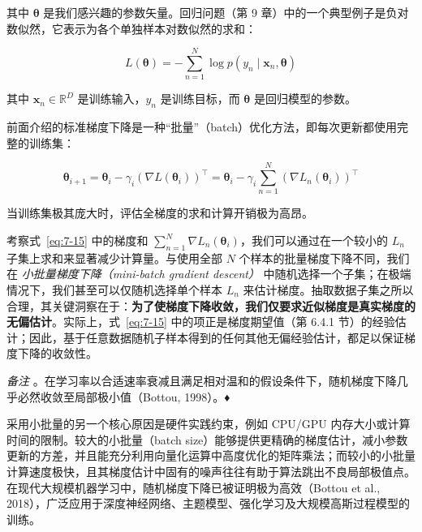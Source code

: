 其中 $ \boldsymbol{\theta} $ 是我们感兴趣的参数矢量。回归问题（第 9 章）中的一个典型例子是负对数似然，它表示为各个单独样本对数似然的求和：

\begin{equation}
L(\boldsymbol{\theta}) = -\sum_{n=1}^N \log p(y_n \mid \boldsymbol{x}_n, \boldsymbol{\theta})
\tag{7.14}\label{eq:7-14}
\end{equation}

其中 $ \boldsymbol{x}_n \in \mathbb{R}^D $ 是训练输入，$ y_n $ 是训练目标，而 $ \boldsymbol{\theta} $ 是回归模型的参数。

前面介绍的标准梯度下降是一种“批量”（batch）优化方法，即每次更新都使用完整的训练集：

\begin{equation}
\boldsymbol{\theta}_{i+1} = \boldsymbol{\theta}_i - \gamma_i (\nabla L(\boldsymbol{\theta}_i))^\top = \boldsymbol{\theta}_i - \gamma_i \sum_{n=1}^N (\nabla L_n(\boldsymbol{\theta}_i))^\top
\tag{7.15}\label{eq:7-15}
\end{equation}

当训练集极其庞大时，评估全梯度的求和计算开销极为高昂。

考察式~\eqref{eq:7-15} 中的梯度和 $ \sum_{n=1}^N \nabla L_n(\boldsymbol{\theta}_i) $，我们可以通过在一个较小的 $ L_n $ 子集上求和来显著减少计算量。与使用全部 $ N $ 个样本的批量梯度下降不同，我们在 \emph{小批量梯度下降（mini-batch gradient descent）} 中随机选择一个子集；在极端情况下，我们甚至可以仅随机选择单个样本 $ L_n $ 来估计梯度。抽取数据子集之所以合理，其关键洞察在于：\textbf{为了使梯度下降收敛，我们仅要求近似梯度是真实梯度的无偏估计}。实际上，式~\eqref{eq:7-15} 中的项正是梯度期望值（第 6.4.1 节）的经验估计；因此，基于任意数据随机子样本得到的任何其他无偏经验估计，都足以保证梯度下降的收敛性。

\emph{备注} 。在学习率以合适速率衰减且满足相对温和的假设条件下，随机梯度下降几乎必然收敛至局部极小值（Bottou, 1998）。♦

采用小批量的另一个核心原因是硬件实践约束，例如 CPU/GPU 内存大小或计算时间的限制。较大的小批量（batch size）能够提供更精确的梯度估计，减小参数更新的方差，并且能充分利用向量化运算中高度优化的矩阵乘法；而较小的小批量计算速度极快，且其梯度估计中固有的噪声往往有助于算法跳出不良局部极值点。在现代大规模机器学习中，随机梯度下降已被证明极为高效（Bottou et al., 2018），广泛应用于深度神经网络、主题模型、强化学习及大规模高斯过程模型的训练。
